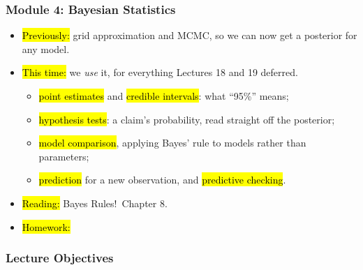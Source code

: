 

\begin{frame}
\frametitle{Module 4: Bayesian Statistics}
    \begin{itemize}
        \item \hl{Previously:} grid approximation and MCMC, so we can now get a posterior for any model.
        \item \hl{This time:} we \emph{use} it, for everything Lectures 18 and 19 deferred.
          \begin{itemize}
              \item \hl{point estimates} and \hl{credible intervals}: what ``95\%'' means;
              \item \hl{hypothesis tests}: a claim's probability, read straight off the posterior;
              \item \hl{model comparison}, applying Bayes' rule to models rather than parameters;
              \item \hl{prediction} for a new observation, and \hl{predictive checking}.
          \end{itemize}
        \item \hl{Reading:} Bayes Rules!\ Chapter 8.
        \item \hl{Homework:}
    \end{itemize}
\end{frame}


\begin{frame}
    \frametitle{Lecture Objectives}
\end{frame}


